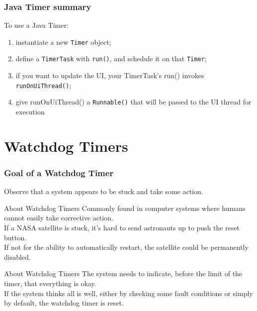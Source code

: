\documentclass[aspectratio=169]{beamer}
\begin{document}
\begin{frame}
\frametitle{Java Timer summary}
\large
To use a Java Timer:
\begin{enumerate}
\item instantiate a new {\tt Timer} object;
\item define a {\tt TimerTask} with \texttt{run()}, and schedule it on that {\tt Timer};
\item if you want to update the UI, your TimerTask's run() invokes \texttt{runOnUiThread()};
\item give runOnUiThread() a \texttt{Runnable()} that will be passed to the UI thread for execution
\end{enumerate}
\end{frame}




\section{Watchdog Timers}




\begin{frame}
\frametitle{Goal of a Watchdog Timer}
\Large
Observe that a system appears to be stuck and take some action.
\end{frame}




\begin{frame}{About Watchdog Timers}
\large
Commonly found in computer systems where humans cannot easily take corrective action. \\
\vspace{1em}
If a NASA satellite is stuck, it's hard to send astronauts up to push the reset button. \\
\vspace{1em}
If not for the ability to automatically restart, the satellite could be permanently disabled. \\
\end{frame}




\begin{frame}{About Watchdog Timers}
\large
The system needs to indicate, before the limit of the timer, that everything is okay.  \\
\vspace{1em}
If the system thinks all is well, either by checking some fault conditions or simply by default, the watchdog timer is reset. \\
\end{frame}
\end{document}
